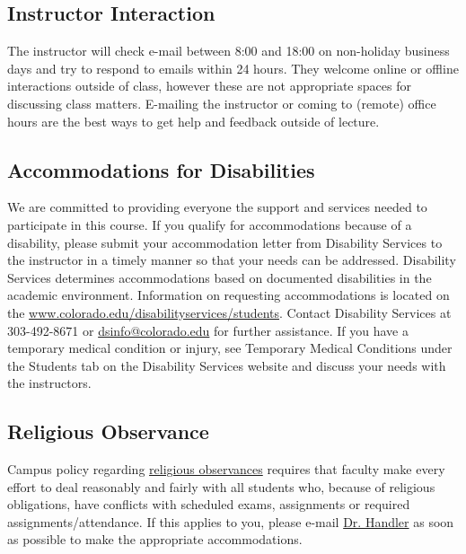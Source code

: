 \documentclass[10pt]{memoir}
\makeatletter
\def\instructorAemail{abram.handler@colorado.edu}
\makeatother
\begin{document}

\subsection{Instructor Interaction}
The instructor will check e-mail between 8:00 and 18:00 on non-holiday business days and try to respond to emails within 24 hours. They welcome online or offline interactions outside of class, however these are not appropriate spaces for discussing class matters. E-mailing the instructor or coming to (remote) office hours are the best ways to get help and feedback outside of lecture.

\subsection{Accommodations for Disabilities}
We are committed to providing everyone the support and services needed to participate in this course. If you qualify for accommodations because of a disability, please submit your accommodation letter from Disability Services to the instructor in a timely manner so that your needs can be addressed. Disability Services determines accommodations based on documented disabilities in the academic environment. Information on requesting accommodations is located on the \href{Disability Services website}{www.colorado.edu/disabilityservices/students}. Contact Disability Services at 303-492-8671 or \href{mailto:dsinfo@colorado.edu}{dsinfo@colorado.edu} for further assistance. If you have a temporary medical condition or injury, see Temporary Medical Conditions under the Students tab on the Disability Services website and discuss your needs with the instructors.

\subsection{Religious Observance}
Campus policy regarding \href{http://www.colorado.edu/policies/observance-religious-holidays-and-absences-classes-andor-exams}{religious observances} requires that faculty make every effort to deal reasonably and fairly with all students who, because of religious obligations, have conflicts with scheduled exams, assignments or required assignments/attendance. If this applies to you, please e-mail \href{\instructorAemail}{Dr. Handler} as soon as possible to make the appropriate accommodations.
\end{document}
